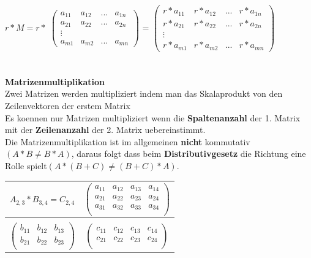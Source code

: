 \documentclass[a4paper]{article} %
\begin{document}
		$r * M = r * $ 	
		$
		\begin{pmatrix}
		a_{11} & a_{12} & ... 	& a_{1n}\\
		a_{21} & a_{22} & ...	& a_{2n}\\
		\vdots &        &	    &\\
		a_{m1} & a_{m2} & ...	& a_{mn}
		\end{pmatrix}
		$
		=
		$
		\begin{pmatrix}
		r*a_{11} & r*a_{12} & ... 	& r*a_{1n}\\
		r*a_{21} & r*a_{22} & ...	& r*a_{2n}\\
		\vdots &        &	    &\\
		r*a_{m1} & r*a_{m2} & ...	& r*a_{mn}
		\end{pmatrix}
		$
		\\\\\\
		\textbf{Matrizenmultiplikation}\\
		Zwei Matrizen werden multipliziert indem man das Skalaprodukt von den Zeilenvektoren der erstem Matrix\\
		Es koennen nur Matrizen multipliziert wenn die \textbf{Spaltenanzahl} der 1. Matrix mit der \textbf{Zeilenanzahl} der 2. Matrix uebereinstimmt.\\
		Die Matrizenmultiplikation ist im allgemeinen\textbf{ nicht} kommutativ$(A*B\neq B*A)$, daraus folgt dass beim \textbf{Distributivgesetz} die Richtung eine Rolle spielt$(A*(B+C)\neq (B+C)*A)$.
	

		\begin{tabular}{c|c}
		$A_{2,3}*B_{3,4} = C_{2,4}$  & 		


		
		$\left(\begin{array}{cccc}
			a_{11} 	&  a_{12}  &	a_{13} 	&	 a_{14}  \\ 
			a_{21}  &  a_{22}  &	a_{23} 	&	 a_{24}  \\
			a_{31}  &  a_{32}  &	a_{33}  &	 a_{34}  \\
		\end{array}\right)$ \\
		\hline \\
		
		
		$				 
		\left(\begin{array}{ccc}
		 b_{11} 	&  b_{12} &	b_{13}\\  
		 b_{21} 	&  b_{22} &	b_{23}\\
		\end{array}\right) 
		$ & 

		$\left(\begin{array}{cccc}
			c_{11} 	& c_{12} &	c_{13}	&	c_{14} \\ 
			c_{21} 	&  c_{22} &	c_{23}	&	 c_{24} \\
		\end{array}\right)$ \\
		\end{tabular}
\end{document}
